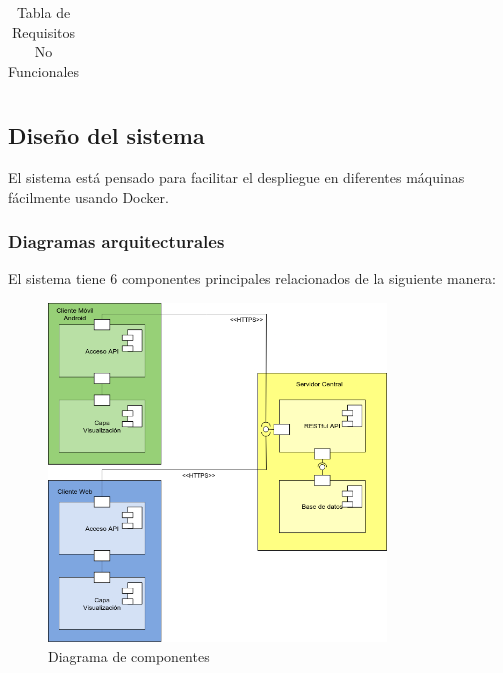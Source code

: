 \documentclass{article}
\begin{document}
\begin{center}
\begin{longtable}{ | p{} | p{} | }
        \caption{Tabla de Requisitos No Funcionales}
    \end{longtable}
\end{center}

\subsection{Diseño del sistema}


El sistema está pensado para facilitar el despliegue en diferentes máquinas
fácilmente usando Docker.

\subsubsection{Diagramas arquitecturales}

El sistema tiene 6 componentes principales relacionados de la siguiente manera:
\begin{figure}[htb]
    \centering
    \includegraphics[width=0.8\textwidth]{./images/diagrama_componentes.png}
    \caption{Diagrama de componentes}
    \label{fig:diag_componentes}
\end{figure}
\end{document}

